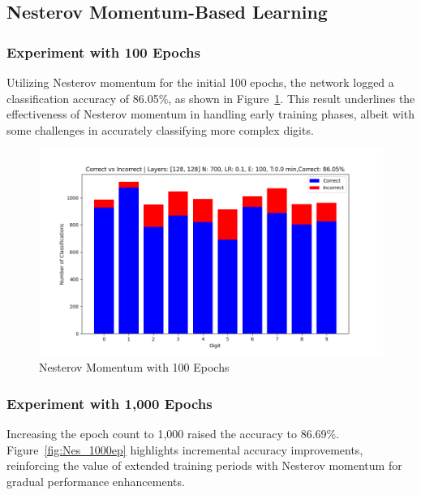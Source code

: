 \documentclass{article}
\begin{document}
\subsection{Nesterov Momentum-Based Learning}

\subsubsection{Experiment with 100 Epochs}
Utilizing Nesterov momentum for the initial 100 epochs, the network logged a classification accuracy of 86.05\%, as shown in Figure~\ref{fig:Nes_100ep}. This result underlines the effectiveness of Nesterov momentum in handling early training phases, albeit with some challenges in accurately classifying more complex digits.

\begin{figure}[h!]
    \centering
    \includegraphics[scale=0.5]{../figs/Nes_100ep.png}
    \caption{Nesterov Momentum with 100 Epochs}
    \label{fig:Nes_100ep}
\end{figure}

\subsubsection{Experiment with 1,000 Epochs}
Increasing the epoch count to 1,000 raised the accuracy to 86.69\%. Figure~\ref{fig:Nes_1000ep} highlights incremental accuracy improvements, reinforcing the value of extended training periods with Nesterov momentum for gradual performance enhancements.
\end{document}
